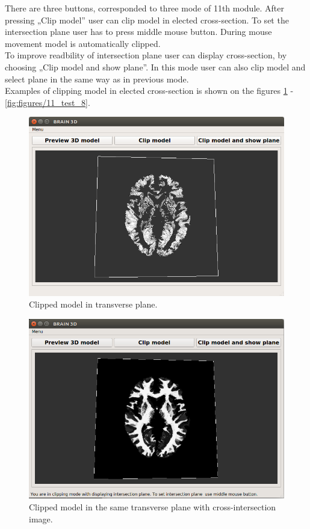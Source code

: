 \indent There are three buttons, corresponded to three mode of 11th module. After pressing „Clip model” user can clip model in elected cross-section. To set the intersection plane user has to press middle mouse button. During mouse movement model is automatically clipped.\\

\indent To improve readbility of intersection plane user can display cross-section, by choosing „Clip model and show plane”. In this mode user can also clip model and select plane in the same way as in previous mode.\\
\indent Examples of clipping model in elected cross-section is shown on the figures \ref{fig:figures/11_test_3} - \ref{fig:figures/11_test_8}.

\begin{figure}[H]
\centering{}\includegraphics[scale=0.7]{figures/Module_11/11_test_3.png}\caption{Clipped model in transverse plane. \label{fig:figures/11_test_3}}
\end{figure}

\begin{figure}[H]
\centering{}\includegraphics[scale=0.7]{figures/Module_11/11_test_4.png}\caption{Clipped model in the same transverse plane with cross-intersection image. \label{fig:figures/11_test_4}}
\end{figure}

